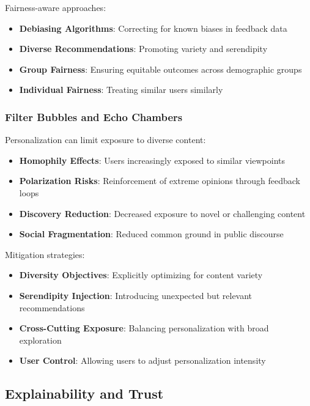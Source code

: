 \documentclass[acmsmall,review,anonymous]{acmart}
\begin{document}
Fairness-aware approaches:
\begin{itemize}
    \item \textbf{Debiasing Algorithms}: Correcting for known biases in feedback data
    \item \textbf{Diverse Recommendations}: Promoting variety and serendipity
    \item \textbf{Group Fairness}: Ensuring equitable outcomes across demographic groups
    \item \textbf{Individual Fairness}: Treating similar users similarly
\end{itemize}

\subsubsection{Filter Bubbles and Echo Chambers}

Personalization can limit exposure to diverse content:

\begin{itemize}
    \item \textbf{Homophily Effects}: Users increasingly exposed to similar viewpoints
    \item \textbf{Polarization Risks}: Reinforcement of extreme opinions through feedback loops
    \item \textbf{Discovery Reduction}: Decreased exposure to novel or challenging content
    \item \textbf{Social Fragmentation}: Reduced common ground in public discourse
\end{itemize}

Mitigation strategies:
\begin{itemize}
    \item \textbf{Diversity Objectives}: Explicitly optimizing for content variety
    \item \textbf{Serendipity Injection}: Introducing unexpected but relevant recommendations
    \item \textbf{Cross-Cutting Exposure}: Balancing personalization with broad exploration
    \item \textbf{User Control}: Allowing users to adjust personalization intensity
\end{itemize}

\subsection{Explainability and Trust}
\end{document}
